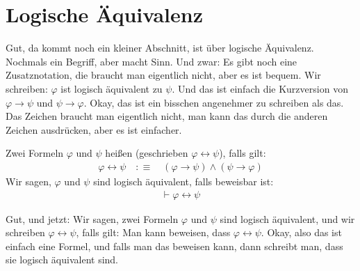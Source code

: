 \section{Logische Äquivalenz}

\begin{spoken-clean}[01:07:46 - 01:08:38]
Gut, da kommt noch ein kleiner Abschnitt, ist über logische Äquivalenz. Nochmals ein Begriff, aber macht Sinn. Und zwar: Es gibt noch eine Zusatznotation, die braucht man eigentlich nicht, aber es ist bequem. Wir schreiben: $\varphi$ ist logisch äquivalent zu $\psi$. Und das ist einfach die Kurzversion von $\varphi \rightarrow \psi$ und $\psi \rightarrow \varphi$. Okay, das ist ein bisschen angenehmer zu schreiben als das. Das Zeichen braucht man eigentlich nicht, man kann das durch die anderen Zeichen ausdrücken, aber es ist einfacher.
\end{spoken-clean}

\begin{math-stroke}
Zwei Formeln $\varphi$ und $\psi$ heißen  (geschrieben $\varphi \leftrightarrow \psi$), falls gilt:
\begin{align}
    \varphi \leftrightarrow \psi \quad :\equiv \quad (\varphi \rightarrow \psi) \wedge (\psi \rightarrow \varphi) \nonumber
\end{align}
Wir sagen, $\varphi$ und $\psi$ sind logisch äquivalent, falls beweisbar ist:
\begin{align}
    \vdash \varphi \leftrightarrow \psi \nonumber
\end{align}
\end{math-stroke}

\begin{spoken-clean}[01:08:40 - 01:09:45]
Gut, und jetzt: Wir sagen, zwei Formeln $\varphi$ und $\psi$ sind logisch äquivalent, und wir schreiben $\varphi \leftrightarrow \psi$, falls gilt: Man kann beweisen, dass $\varphi \leftrightarrow \psi$. Okay, also das ist einfach eine Formel, und falls man das beweisen kann, dann schreibt man, dass sie logisch äquivalent sind.
\end{spoken-clean}

